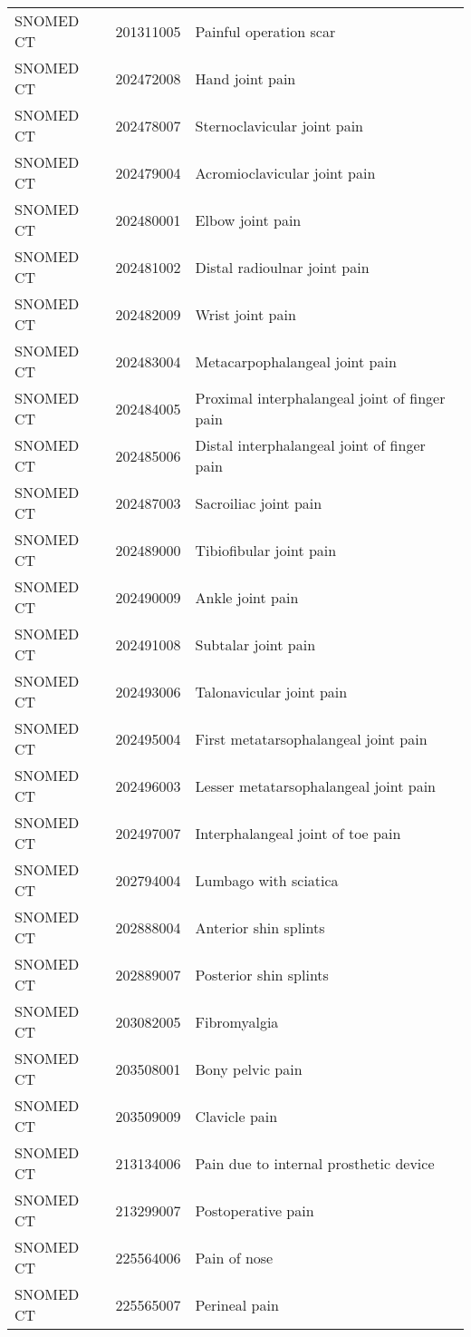 \begin{longtable}{p{}p{}p{}}
  SNOMED CT & 201311005 & Painful operation scar \\ 
  SNOMED CT & 202472008 & Hand joint pain \\ 
  SNOMED CT & 202478007 & Sternoclavicular joint pain \\ 
  SNOMED CT & 202479004 & Acromioclavicular joint pain \\ 
  SNOMED CT & 202480001 & Elbow joint pain \\ 
  SNOMED CT & 202481002 & Distal radioulnar joint pain \\ 
  SNOMED CT & 202482009 & Wrist joint pain \\ 
  SNOMED CT & 202483004 & Metacarpophalangeal joint pain \\ 
  SNOMED CT & 202484005 & Proximal interphalangeal joint of finger pain \\ 
  SNOMED CT & 202485006 & Distal interphalangeal joint of finger pain \\ 
  SNOMED CT & 202487003 & Sacroiliac joint pain \\ 
  SNOMED CT & 202489000 & Tibiofibular joint pain \\ 
  SNOMED CT & 202490009 & Ankle joint pain \\ 
  SNOMED CT & 202491008 & Subtalar joint pain \\ 
  SNOMED CT & 202493006 & Talonavicular joint pain \\ 
  SNOMED CT & 202495004 & First metatarsophalangeal joint pain \\ 
  SNOMED CT & 202496003 & Lesser metatarsophalangeal joint pain \\ 
  SNOMED CT & 202497007 & Interphalangeal joint of toe pain \\ 
  SNOMED CT & 202794004 & Lumbago with sciatica \\ 
  SNOMED CT & 202888004 & Anterior shin splints \\ 
  SNOMED CT & 202889007 & Posterior shin splints \\ 
  SNOMED CT & 203082005 & Fibromyalgia \\ 
  SNOMED CT & 203508001 & Bony pelvic pain \\ 
  SNOMED CT & 203509009 & Clavicle pain \\ 
  SNOMED CT & 213134006 & Pain due to internal prosthetic device \\ 
  SNOMED CT & 213299007 & Postoperative pain \\ 
  SNOMED CT & 225564006 & Pain of nose \\ 
  SNOMED CT & 225565007 & Perineal pain \\ 

\end{longtable}
